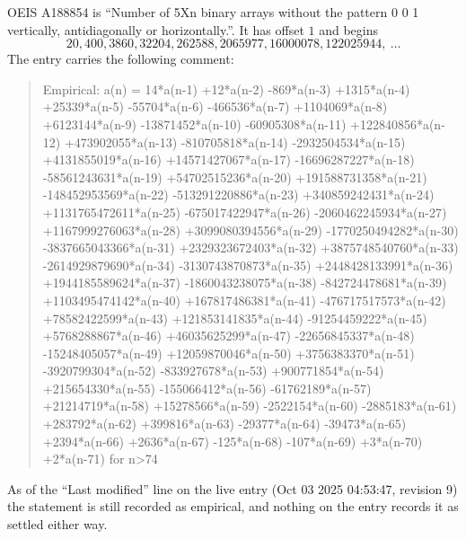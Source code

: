 \documentclass[11pt,a4paper]{article}
\theoremstyle{plain}
\theoremstyle{definition}
\begin{document}
OEIS A188854 is ``Number of 5Xn binary arrays without the pattern 0 0 1 vertically, antidiagonally or horizontally.''. It has offset $1$ and begins
\[
20, 400, 3860, 32204, 262588, 2065977, 16000078, 122025944,\ \dots
\]
The entry carries the following comment:
\begin{quote}\small
Empirical: a(n) = 14*a(n-1) +12*a(n-2) -869*a(n-3) +1315*a(n-4) +25339*a(n-5) -55704*a(n-6) -466536*a(n-7) +1104069*a(n-8) +6123144*a(n-9) -13871452*a(n-10) -60905308*a(n-11) +122840856*a(n-12) +473902055*a(n-13) -810705818*a(n-14) -2932504534*a(n-15) +4131855019*a(n-16) +14571427067*a(n-17) -16696287227*a(n-18) -58561243631*a(n-19) +54702515236*a(n-20) +191588731358*a(n-21) -148452953569*a(n-22) -513291220886*a(n-23) +340859242431*a(n-24) +1131765472611*a(n-25) -675017422947*a(n-26) -2060462245934*a(n-27) +1167999276063*a(n-28) +3099080394556*a(n-29) -1770250494282*a(n-30) -3837665043366*a(n-31) +2329323672403*a(n-32) +3875748540760*a(n-33) -2614929879690*a(n-34) -3130743870873*a(n-35) +2448428133991*a(n-36) +1944185589624*a(n-37) -1860043238075*a(n-38) -842724478681*a(n-39) +1103495474142*a(n-40) +167817486381*a(n-41) -476717517573*a(n-42) +78582422599*a(n-43) +121853141835*a(n-44) -91254459222*a(n-45) +5768288867*a(n-46) +46035625299*a(n-47) -22656845337*a(n-48) -15248405057*a(n-49) +12059870046*a(n-50) +3756383370*a(n-51) -3920799304*a(n-52) -833927678*a(n-53) +900771854*a(n-54) +215654330*a(n-55) -155066412*a(n-56) -61762189*a(n-57) +21214719*a(n-58) +15278566*a(n-59) -2522154*a(n-60) -2885183*a(n-61) +283792*a(n-62) +399816*a(n-63) -29377*a(n-64) -39473*a(n-65) +2394*a(n-66) +2636*a(n-67) -125*a(n-68) -107*a(n-69) +3*a(n-70) +2*a(n-71) for n>74
\end{quote}
As of the ``Last modified'' line on the live entry (Oct 03 2025 04:53:47, revision 9) the statement is
still recorded as empirical, and nothing on the entry records it as settled either way.
\end{document}
